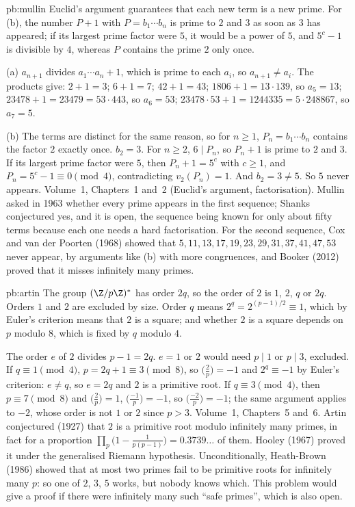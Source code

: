 \begin{solution}{pb:mullin}
\idea Euclid's argument guarantees that each new term is a new prime. For (b), the number $P+1$ with $P=b_1\cdots b_n$ is prime to
$2$ and $3$ as soon as $3$ has appeared; if its largest prime factor were $5$, it would be a power of $5$, and $5^c-1$ is
divisible by $4$, whereas $P$ contains the prime $2$ only once.

\writeup (a) $a_{n+1}$ divides $a_1\cdots a_n+1$, which is prime to each $a_i$, so $a_{n+1}\ne a_i$. The products give:
$2+1=3$; $6+1=7$; $42+1=43$; $1806+1=13\cdot139$, so $a_5=13$; $23478+1=23479=53\cdot443$, so $a_6=53$;
$23478\cdot53+1=1244335=5\cdot248867$, so $a_7=5$.

(b) The terms are distinct for the same reason, so for $n\ge1$, $P_n=b_1\cdots b_n$ contains the factor $2$ exactly once. $b_2=3$. For
$n\ge2$, $6\mid P_n$, so $P_n+1$ is prime to $2$ and $3$. If its largest prime factor were $5$, then $P_n+1=5^c$ with $c\ge1$, and
$P_n=5^c-1\equiv0\pmod4$, contradicting $v_2(P_n)=1$. And $b_2=3\ne5$. So $5$ never appears.
\tools Volume~1, Chapters~1 and~2 (Euclid's argument, factorisation).
\leads Mullin asked in 1963 whether every prime appears in the first sequence; Shanks conjectured yes, and it is open, the
sequence being known for only about fifty terms because each one needs a hard factorisation. For the second sequence, Cox and
van der Poorten (1968) showed that $5,11,13,17,19,23,29,31,37,41,47,53$ never appear, by arguments like (b) with more
congruences, and Booker (2012) proved that it misses infinitely many primes.
\end{solution}

\begin{solution}{pb:artin}
\idea The group $(\Z/p\Z)^*$ has order $2q$, so the order of $2$ is $1$, $2$, $q$ or $2q$. Orders $1$ and $2$ are excluded by size. Order
$q$ means $2^q=2^{(p-1)/2}\equiv1$, which by Euler's criterion means that $2$ is a square; and whether $2$ is a square depends on $p$
modulo $8$, which is fixed by $q$ modulo $4$.

\writeup The order $e$ of $2$ divides $p-1=2q$. $e=1$ or $2$ would need $p\mid1$ or $p\mid3$, excluded. If $q\equiv1\pmod4$, $p=2q+1\equiv3\pmod8$,
so $\bigl(\frac2p\bigr)=-1$ and $2^q\equiv-1$ by Euler's criterion: $e\ne q$, so $e=2q$ and $2$ is a primitive root. If $q\equiv3\pmod4$, then
$p\equiv7\pmod8$ and $\bigl(\frac2p\bigr)=1$, $\bigl(\frac{-1}p\bigr)=-1$, so $\bigl(\frac{-2}p\bigr)=-1$; the same argument applies to $-2$, whose order is
not $1$ or $2$ since $p>3$.
\tools Volume~1, Chapters~5 and~6.
\leads Artin conjectured (1927) that $2$ is a primitive root modulo infinitely many primes, in fact for a proportion $\prod_p\bigl(1-\frac1{p(p-1)}\bigr)
=0.3739\ldots$ of them. Hooley (1967) proved it under the generalised Riemann hypothesis. Unconditionally, Heath-Brown (1986) showed that at most two
primes fail to be primitive roots for infinitely many $p$: so one of $2$, $3$, $5$ works, but nobody knows which. This problem would
give a proof if there were infinitely many such ``safe primes'', which is also open.
\end{solution}

